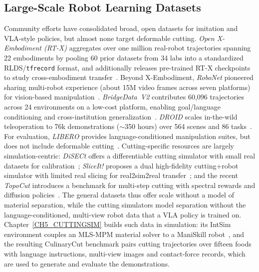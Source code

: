 \subsection{Large-Scale Robot Learning Datasets}
    Community efforts have consolidated broad, open datasets for imitation and VLA-style policies, but almost none target deformable cutting. \emph{Open X-Embodiment (RT-X)} aggregates over one million real-robot trajectories spanning 22 embodiments by pooling 60 prior datasets from 34 labs into a standardized RLDS/\texttt{tfrecord} format, and additionally releases pre-trained RT-X checkpoints to study cross-embodiment transfer~\citep{o2024open}. Beyond X-Embodiment, \emph{RoboNet} pioneered sharing multi-robot experience (about 15M video frames across seven platforms) for vision-based manipulation~\citep{robonet2019}. \emph{BridgeData~V2} contributes 60{,}096 trajectories across 24 environments on a low-cost platform, enabling goal/language conditioning and cross-institution generalization~\citep{bridgedata2023}. \emph{DROID} scales in-the-wild teleoperation to 76k demonstrations ($\sim$350 hours) over 564 scenes and 86 tasks~\citep{khazatsky2025droidlargescaleinthewildrobot}. For evaluation, \emph{LIBERO} provides language-conditioned manipulation suites, but does not include deformable cutting~\citep{libero2023}. Cutting-specific resources are largely simulation-centric: \emph{DiSECt} offers a differentiable cutting simulator with small real datasets for calibration~\citep{disect2022}; \emph{SliceIt!} proposes a dual high-fidelity cutting+robot simulator with limited real slicing for real2sim2real transfer~\citep{sliceit2024}; and the recent \emph{TopoCut} introduces a benchmark for multi-step cutting with spectral rewards and diffusion policies~\citep{topocut2025}. The general datasets thus offer scale without a model of material separation, while the cutting simulators model separation without the language-conditioned, multi-view robot data that a VLA policy is trained on. Chapter~\ref{CH5_CUTTINGSIM} builds such data in simulation: its IntSim environment couples an MLS-MPM material solver to a ManiSkill robot~\citep{gu2023ManiSkill2}, and the resulting CulinaryCut benchmark pairs cutting trajectories over fifteen foods with language instructions, multi-view images and contact-force records, which are used to generate and evaluate the demonstrations.
    